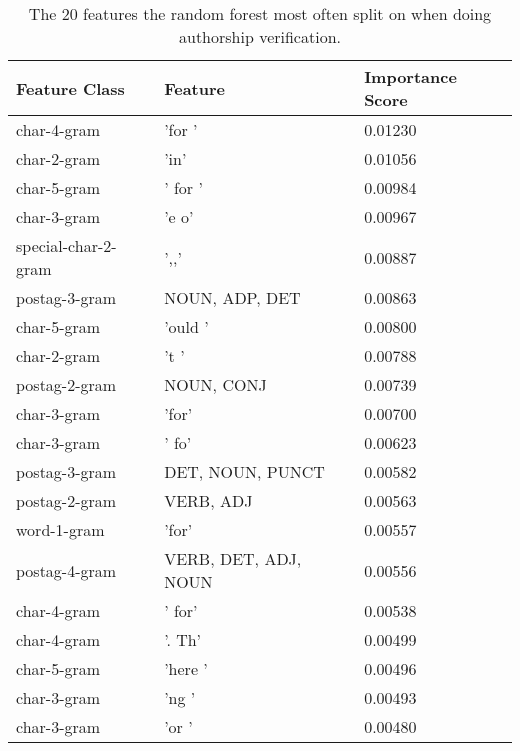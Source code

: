\begin{table}
    \centering
    \begin{tabular}{lll}
        \textbf{Feature Class} & \textbf{Feature}     & \textbf{Importance Score} \\
        \hline
        char-4-gram            & 'for '               & 0.01230                   \\
        char-2-gram            & 'in'                 & 0.01056                   \\
        char-5-gram            & ' for '              & 0.00984                   \\
        char-3-gram            & 'e o'                & 0.00967                   \\
        special-char-2-gram    & ',,'                 & 0.00887                   \\
        postag-3-gram          & NOUN, ADP, DET       & 0.00863                   \\
        char-5-gram            & 'ould '              & 0.00800                   \\
        char-2-gram            & 't '                 & 0.00788                   \\
        postag-2-gram          & NOUN, CONJ           & 0.00739                   \\
        char-3-gram            & 'for'                & 0.00700                   \\
        char-3-gram            & ' fo'                & 0.00623                   \\
        postag-3-gram          & DET, NOUN, PUNCT     & 0.00582                   \\
        postag-2-gram          & VERB, ADJ            & 0.00563                   \\
        word-1-gram            & 'for'                & 0.00557                   \\
        postag-4-gram          & VERB, DET, ADJ, NOUN & 0.00556                   \\
        char-4-gram            & ' for'               & 0.00538                   \\
        char-4-gram            & '. Th'               & 0.00499                   \\
        char-5-gram            & 'here '              & 0.00496                   \\
        char-3-gram            & 'ng '                & 0.00493                   \\
        char-3-gram            & 'or '                & 0.00480
    \end{tabular}
    \caption{The 20 features the random forest most often split on when doing
    authorship verification.}
    \label{tab:feature_importance}
\end{table}

